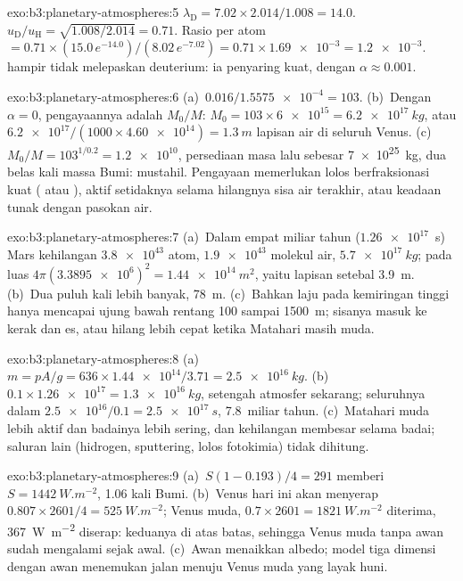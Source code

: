 \begin{solution}{exo:b3:planetary-atmospheres:5}
$\lambda_\mathrm D = 7.02\times2.014/1.008 = 14.0$. $u_\mathrm D/u_\mathrm H
= \sqrt{1.008/2.014} = 0.71$. Rasio per atom $= 0.71\times(15.0\,
e^{-14.0})/(8.02\,e^{-7.02}) = 0.71\times\num{1.69e-3} = \num{1.2e-3}$.
 hampir tidak melepaskan deuterium: ia penyaring kuat, dengan
$\alpha \approx 0.001$.
\end{solution}

\begin{solution}{exo:b3:planetary-atmospheres:6}
(a)~$0.016/\num{1.5575e-4} = 103$. (b)~Dengan $\alpha = 0$, pengayaannya adalah
$M_0/M$: $M_0 = 103\times\num{6e15} = \qty{6.2e17}{kg}$, atau
$\num{6.2e17}/(1000\times\num{4.60e14}) = \qty{1.3}{m}$ lapisan air di seluruh
Venus. (c)~$M_0/M = 103^{1/0.2} = \num{1.2e10}$, persediaan masa lalu sebesar
\qty{7e25}{kg}, dua belas kali massa Bumi: mustahil. Pengayaan
memerlukan lolos berfraksionasi kuat ( atau ),
aktif setidaknya selama hilangnya sisa air terakhir, atau keadaan
tunak dengan pasokan air.
\end{solution}

\begin{solution}{exo:b3:planetary-atmospheres:7}
(a)~Dalam empat miliar tahun ($\num{1.26e17}$~s) Mars kehilangan
$\num{3.8e43}$ atom, $\num{1.9e43}$ molekul air, $\qty{5.7e17}{kg}$;
pada luas $4\pi(\num{3.3895e6})^2 = \qty{1.44e14}{m^2}$, yaitu lapisan
setebal \qty{3.9}{m}. (b)~Dua puluh kali lebih banyak, \qty{78}{m}. (c)~Bahkan laju
pada kemiringan tinggi hanya mencapai ujung bawah rentang 100 sampai
\qty{1500}{m}; sisanya masuk ke kerak dan es, atau hilang
lebih cepat ketika Matahari masih muda.
\end{solution}

\begin{solution}{exo:b3:planetary-atmospheres:8}
(a)~$m = pA/g = 636\times\num{1.44e14}/3.71 = \qty{2.5e16}{kg}$.
(b)~$0.1\times\num{1.26e17} = \qty{1.3e16}{kg}$, setengah
atmosfer sekarang; seluruhnya dalam $\num{2.5e16}/0.1 = \qty{2.5e17}{s}$,
\num{7.8}~miliar tahun. (c)~Matahari muda lebih aktif dan badainya
lebih sering, dan kehilangan membesar selama badai; saluran lain
(hidrogen, sputtering, lolos fotokimia) tidak dihitung.
\end{solution}

\begin{solution}{exo:b3:planetary-atmospheres:9}
(a)~$S(1 - 0.193)/4 = 291$ memberi $S = \qty{1442}{W.m^{-2}}$, 1.06 kali
Bumi. (b)~Venus hari ini akan menyerap $0.807\times2601/4 =
\qty{525}{W.m^{-2}}$; Venus muda, $0.7\times2601 = \qty{1821}{W.m^{-2}}$
diterima, \qty{367}{W.m^{-2}} diserap: keduanya di atas batas, sehingga
Venus muda tanpa awan sudah mengalami  sejak awal. (c)~Awan
menaikkan albedo; model tiga dimensi dengan awan menemukan jalan
menuju Venus muda yang layak huni.
\end{solution}


